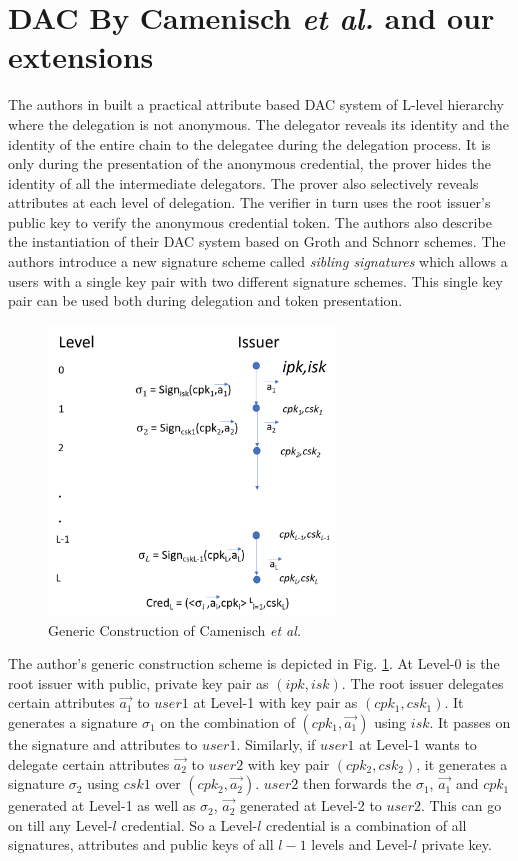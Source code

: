 \documentclass[journal]{IEEEtran}
\begin{document}
\section{DAC By Camenisch \textit{et al.} \cite{CamenischDD17} and our extensions} \label{camen}
The authors in \cite{CamenischDD17} built a practical attribute based DAC system of L-level hierarchy where the delegation is not anonymous. The delegator reveals its identity and the identity of the entire chain to the delegatee during the delegation process. It is only during the presentation of the anonymous credential, the prover hides the identity of all the intermediate delegators. The prover also selectively reveals attributes at each level of delegation. The verifier in turn uses the root issuer's public key to verify the anonymous credential token. The authors also describe the instantiation of their DAC system based on Groth \cite{groth} and Schnorr \cite{rfc8235} schemes. The authors introduce a new signature scheme called \textit{sibling signatures} which allows a users with a single key pair with two different signature schemes. This single key pair can be used both during delegation and token presentation.

\begin{figure}[htbp]
\centerline{\includegraphics[width=3in]{camen.png}}
\caption{Generic Construction of Camenisch \textit{et al.} \cite{CamenischDD17}}
\label{fig:genconst}
\end{figure}

The author's generic construction scheme is depicted in Fig. \ref{fig:genconst}. At Level-0 is the root issuer with public, private key pair as $(ipk,isk)$. The root issuer delegates certain attributes $\overrightarrow{a_1}$ to $user1$ at Level-1 with key pair as $(cpk_1, csk_1)$. It generates a signature $\sigma_1$ on the combination of $(cpk_1,\overrightarrow{a_1})$ using $isk$. It passes on the signature and attributes to  $user1$. Similarly, if $user1$ at Level-1 wants to delegate certain attributes $\overrightarrow{a_2}$ to $user2$ with key pair $(cpk_2, csk_2)$, it generates a signature $\sigma_2$ using $csk1$ over $(cpk_2,\overrightarrow{a_2})$. $user2$ then forwards the $\sigma_1$, $\overrightarrow{a_1}$ and $cpk_1$ generated at Level-1 as well as $\sigma_2$, $\overrightarrow{a_2}$ generated at Level-2 to $user2$. This can go on till any Level-$l$ credential. So a Level-$l$ credential is a combination of all signatures, attributes and public keys of all $l-1$ levels and Level-$l$ private key.
\end{document}
